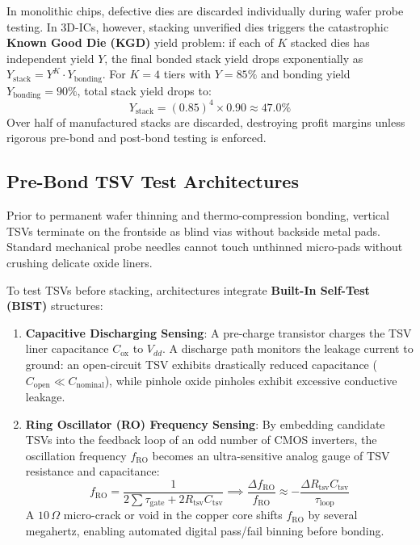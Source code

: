 In monolithic chips, defective dies are discarded individually during wafer probe testing. In 3D-ICs, however, stacking unverified dies triggers the catastrophic \textbf{Known Good Die (KGD)} yield problem: if each of $K$ stacked dies has independent yield $Y$, the final bonded stack yield drops exponentially as $Y_{\mathrm{stack}} = Y^K \cdot Y_{\mathrm{bonding}}$. For $K = 4$ tiers with $Y = 85\%$ and bonding yield $Y_{\mathrm{bonding}} = 90\%$, total stack yield drops to:
\begin{equation}
Y_{\mathrm{stack}} = (0.85)^4 \times 0.90 \approx 47.0\%
\end{equation}
Over half of manufactured stacks are discarded, destroying profit margins unless rigorous pre-bond and post-bond testing is enforced.

\subsection{Pre-Bond TSV Test Architectures}
Prior to permanent wafer thinning and thermo-compression bonding, vertical TSVs terminate on the frontside as blind vias without backside metal pads. Standard mechanical probe needles cannot touch unthinned micro-pads without crushing delicate oxide liners.

To test TSVs before stacking, architectures integrate \textbf{Built-In Self-Test (BIST)} structures:
\begin{enumerate}
    \item \textbf{Capacitive Discharging Sensing}: A pre-charge transistor charges the TSV liner capacitance $C_{\mathrm{ox}}$ to $V_{dd}$. A discharge path monitors the leakage current to ground: an open-circuit TSV exhibits drastically reduced capacitance ($C_{\mathrm{open}} \ll C_{\mathrm{nominal}}$), while pinhole oxide pinholes exhibit excessive conductive leakage.
    \item \textbf{Ring Oscillator (RO) Frequency Sensing}: By embedding candidate TSVs into the feedback loop of an odd number of CMOS inverters, the oscillation frequency $f_{\mathrm{RO}}$ becomes an ultra-sensitive analog gauge of TSV resistance and capacitance:
    \begin{equation}
    f_{\mathrm{RO}} = \frac{1}{2 \sum \tau_{\mathrm{gate}} + 2 R_{\mathrm{tsv}} C_{\mathrm{tsv}}} \implies \frac{\Delta f_{\mathrm{RO}}}{f_{\mathrm{RO}}} \approx -\frac{\Delta R_{\mathrm{tsv}} C_{\mathrm{tsv}}}{\tau_{\mathrm{loop}}}
    \label{eq:ch8_ro_freq}
    \end{equation}
    A $10\,\Omega$ micro-crack or void in the copper core shifts $f_{\mathrm{RO}}$ by several megahertz, enabling automated digital pass/fail binning before bonding.
\end{enumerate}

